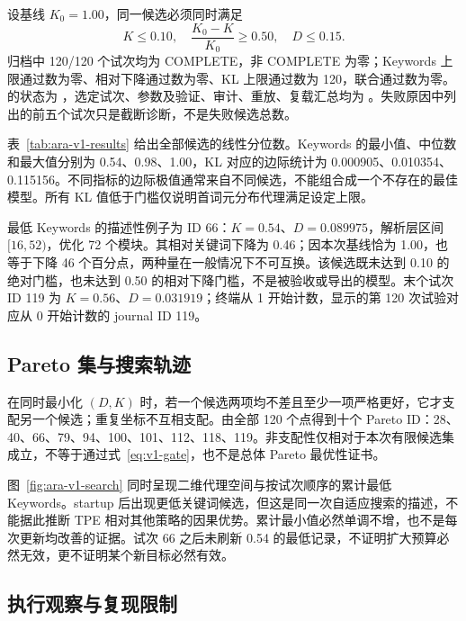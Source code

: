 设基线 $K_0=1.00$，同一候选必须同时满足
\begin{equation}
 K\leq0.10,\quad \frac{K_0-K}{K_0}\geq0.50,\quad D\leq0.15.
 \label{eq:v1-gate}
\end{equation}
归档中 120/120 个试次均为 COMPLETE，非 COMPLETE 为零；Keywords 上限通过数为零、相对下降通过数为零、KL 上限通过数为 120，联合通过数为零。 的状态为 ，选定试次、参数及验证、审计、重放、复载汇总均为 。失败原因中列出的前五个试次只是截断诊断，不是失败候选总数。



表~\ref{tab:ara-v1-results} 给出全部候选的线性分位数。Keywords 的最小值、中位数和最大值分别为 0.54、0.98、1.00，KL 对应的边际统计为 0.000905、0.010354、0.115156。不同指标的边际极值通常来自不同候选，不能组合成一个不存在的最佳模型。所有 KL 值低于门槛仅说明首词元分布代理满足设定上限。

最低 Keywords 的描述性例子为 ID 66：$K=0.54$、$D=0.089975$，解析层区间 $[16,52)$，优化 72 个模块。其相对关键词下降为 0.46；因本次基线恰为 1.00，也等于下降 46 个百分点，两种量在一般情况下不可互换。该候选既未达到 0.10 的绝对门槛，也未达到 0.50 的相对下降门槛，不是被验收或导出的模型。末个试次 ID 119 为 $K=0.56$、$D=0.031919$；终端从 1 开始计数，显示的第 120 次试验对应从 0 开始计数的 journal ID 119。

\subsection{Pareto 集与搜索轨迹}

在同时最小化 $(D,K)$ 时，若一个候选两项均不差且至少一项严格更好，它才支配另一个候选；重复坐标不互相支配。由全部 120 个点得到十个 Pareto ID：28、40、66、79、94、100、101、112、118、119。非支配性仅相对于本次有限候选集成立，不等于通过式~\eqref{eq:v1-gate}，也不是总体 Pareto 最优性证书。



图~\ref{fig:ara-v1-search} 同时呈现二维代理空间与按试次顺序的累计最低 Keywords。startup 后出现更低关键词候选，但这是同一次自适应搜索的描述，不能据此推断 TPE 相对其他策略的因果优势。累计最小值必然单调不增，也不是每次更新均改善的证据。试次 66 之后未刷新 0.54 的最低记录，不证明扩大预算必然无效，更不证明某个新目标必然有效。

\subsection{执行观察与复现限制}

